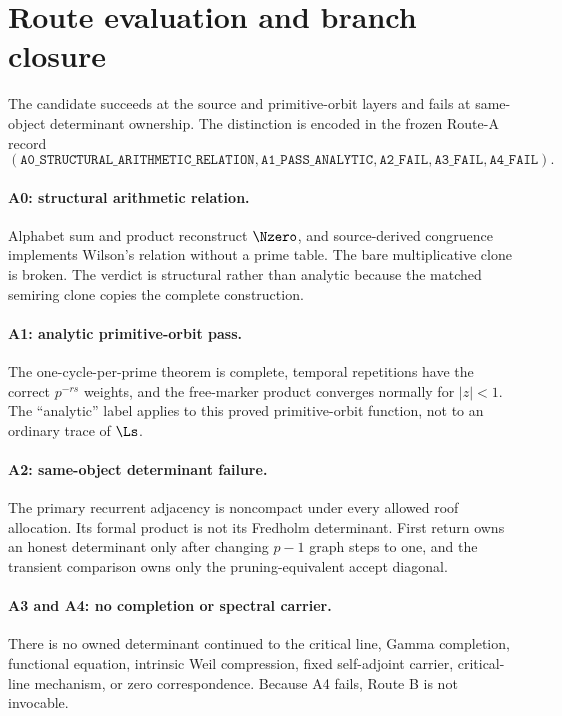 \section{Route evaluation and branch closure}
\label{sec:route-closure}

The candidate succeeds at the source and primitive-orbit layers and fails at
same-object determinant ownership.  The distinction is encoded in the
frozen Route-A record
\[
\boxed{(
\texttt{A0\_STRUCTURAL\_ARITHMETIC\_RELATION},
\texttt{A1\_PASS\_ANALYTIC},
\texttt{A2\_FAIL},
\texttt{A3\_FAIL},
\texttt{A4\_FAIL})}.
\]

\paragraph{A0: structural arithmetic relation.}
Alphabet sum and product reconstruct $\Nzero$, and source-derived congruence
implements Wilson's relation without a prime table.  The bare multiplicative
clone is broken.  The verdict is structural rather than analytic because the
matched semiring clone copies the complete construction.

\paragraph{A1: analytic primitive-orbit pass.}
The one-cycle-per-prime theorem is complete, temporal repetitions have the
correct $p^{-rs}$ weights, and the free-marker product converges normally for
$|z|<1$.  The ``analytic'' label applies to this proved primitive-orbit
function, not to an ordinary trace of $\Ls$.

\paragraph{A2: same-object determinant failure.}
The primary recurrent adjacency is noncompact under every allowed roof
allocation.  Its formal product is not its Fredholm determinant.  First
return owns an honest determinant only after changing $p-1$ graph steps to
one, and the transient comparison owns only the pruning-equivalent accept
diagonal.

\paragraph{A3 and A4: no completion or spectral carrier.}
There is no owned determinant continued to the critical line, Gamma
completion, functional equation, intrinsic Weil compression, fixed
self-adjoint carrier, critical-line mechanism, or zero correspondence.
Because A4 fails, Route B is not invocable.


